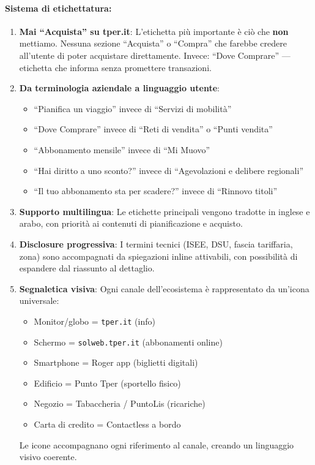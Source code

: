 \begin{tcolorbox}[colback=backgroundColor,colframe=borderColor,arc=2mm]
{\paragraph{Sistema di etichettatura:}

\begin{enumerate}[leftmargin=*]
 \item \textbf{Mai ``Acquista'' su tper.it}: L'etichetta più importante è ciò che \textbf{non} mettiamo. Nessuna sezione ``Acquista'' o ``Compra'' che farebbe credere all'utente di poter acquistare direttamente. Invece: ``Dove Comprare'' --- etichetta che informa senza promettere transazioni.

 \item \textbf{Da terminologia aziendale a linguaggio utente}:
 \begin{itemize}
   \item ``Pianifica un viaggio'' invece di ``Servizi di mobilità''
   \item ``Dove Comprare'' invece di ``Reti di vendita'' o ``Punti vendita''
   \item ``Abbonamento mensile'' invece di ``Mi Muovo''
   \item ``Hai diritto a uno sconto?'' invece di ``Agevolazioni e delibere regionali''
   \item ``Il tuo abbonamento sta per scadere?'' invece di ``Rinnovo titoli''
 \end{itemize}

 \item \textbf{Supporto multilingua}: Le etichette principali vengono tradotte in inglese e arabo, con priorità ai contenuti di pianificazione e acquisto.

 \item \textbf{Disclosure progressiva}: I termini tecnici (ISEE, DSU, fascia tariffaria, zona) sono accompagnati da spiegazioni inline attivabili, con possibilità di espandere dal riassunto al dettaglio.

 \item \textbf{Segnaletica visiva}: Ogni canale dell'ecosistema è rappresentato da un'icona universale:
 \begin{itemize}
   \item Monitor/globo = \texttt{tper.it} (info)
   \item Schermo = \texttt{solweb.tper.it} (abbonamenti online)
   \item Smartphone = Roger app (biglietti digitali)
   \item Edificio = Punto Tper (sportello fisico)
   \item Negozio = Tabaccheria / PuntoLis (ricariche)
   \item Carta di credito = Contactless a bordo
 \end{itemize}
 Le icone accompagnano ogni riferimento al canale, creando un linguaggio visivo coerente.

\end{enumerate}
}
\end{tcolorbox}

